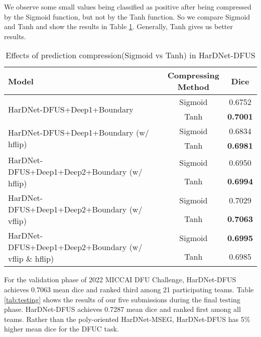 \documentclass[runningheads]{llncs}
\begin{document}
We observe some small values being classified as positive after being compressed by the Sigmoid function, but not by the Tanh function.
So we compare Sigmoid and Tanh and show the results in Table \ref{tab:tanh}. Generally, Tanh gives us better results.


\begin{table}[!ht] 
\centering
\caption{Effects of prediction compression(Sigmoid vs Tanh) in HarDNet-DFUS\label{tab:tanh}}
\begin{tabular}{l|c|c}
\hline \hline
                        Model   & \makecell[c]{Compressing \\ Method}   & Dice  \\ \hline \hline
\multirow{2}{*}{HarDNet-DFUS+Deep1+Boundary}   & Sigmoid       & 0.6752  \\ \cline{2-3}
                                & Tanh          & { \bfseries 0.7001} \\ \hline

\multirow{2}{*}{HarDNet-DFUS+Deep1+Boundary (w/ hflip)}   & Sigmoid       & 0.6834  \\ \cline{2-3}
                                & Tanh          & { \bfseries 0.6981} \\ \hline
                                
\multirow{2}{*}{HarDNet-DFUS+Deep1+Deep2+Boundary (w/ hflip)}   & Sigmoid       & 0.6950  \\ \cline{2-3}
                                & Tanh          & { \bfseries 0.6994} \\ \hline

\multirow{2}{*}{HarDNet-DFUS+Deep1+Deep2+Boundary (w/ vflip)}   & Sigmoid       & 0.7029  \\ \cline{2-3}
                                & Tanh          & { \bfseries 0.7063} \\ \hline
                                
\multirow{2}{*}{HarDNet-DFUS+Deep1+Deep2+Boundary (w/ vflip \& hflip)}   & Sigmoid       & { \bfseries 0.6995}  \\ \cline{2-3}
                                & Tanh          & 0.6985 \\ \hline
\end{tabular}
\end{table}

For the validation phase of 2022 MICCAI DFU Challenge,
HarDNet-DFUS achieves 0.7063 mean dice and ranked third among 21 participating teams. 
Table \ref{tab:testing} shows the results of our five submissions
during the final testing phase.
HarDNet-DFUS achieves 0.7287 mean dice and ranked first among all teams.
Rather than the poly-oriented HarDNet-MSEG, HarDNet-DFUS has 5\% higher mean dice for the DFUC task. 
\end{document}
